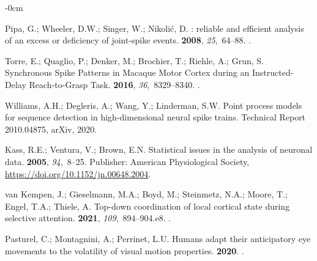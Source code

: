 \documentclass[brainsci, %
               review,submit,pdftex,moreauthors
               ]{Definitions/mdpi}
\begin{document}
\begin{adjustwidth}{-\extralength}{0cm}
\begin{thebibliography}{999}
  Pipa, G.; Wheeler, D.W.; Singer, W.; Nikolić, D.
  : reliable and efficient analysis of an excess or
    deficiency of joint-spike events.
   {\bf 2008}, {\em
    25},~64--88.
  .
  
  Torre, E.; Quaglio, P.; Denker, M.; Brochier, T.; Riehle, A.; Grun, S.
  \newblock Synchronous {Spike} {Patterns} in {Macaque} {Motor} {Cortex} during
    an {Instructed}-{Delay} {Reach}-to-{Grasp} {Task}.
   {\bf 2016}, {\em 36},~8329--8340.
  .
  
  Williams, A.H.; Degleris, A.; Wang, Y.; Linderman, S.W.
  \newblock Point process models for sequence detection in high-dimensional
    neural spike trains.
  \newblock Technical Report 2010.04875, arXiv,  2020.
  
  Kass, R.E.; Ventura, V.; Brown, E.N.
  \newblock Statistical issues in the analysis of neuronal data.
   {\bf 2005}, {\em 94},~8--25.
  \newblock Publisher: American Physiological Society,
    {\url{https://doi.org/10.1152/jn.00648.2004}}.
  
  van Kempen, J.; Gieselmann, M.A.; Boyd, M.; Steinmetz, N.A.; Moore, T.; Engel,
    T.A.; Thiele, A.
  \newblock Top-down coordination of local cortical state during selective
    attention.
   {\bf 2021}, {\em 109},~894--904.e8.
  .
  
  Pasturel, C.; Montagnini, A.; Perrinet, L.U.
  \newblock Humans adapt their anticipatory eye movements to the volatility of
    visual motion properties.
   {\bf 2020}.
  .
  

\end{thebibliography}
\end{adjustwidth}
\end{document}
